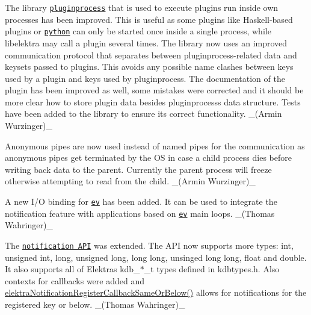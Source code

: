 \begin{DoxyItemize}
\item The library \href{http://master.libelektra.org/src/libs/pluginprocess}{\tt {\ttfamily pluginprocess}} that is used to execute plugins run inside own processes has been improved. This is useful as some plugins like Haskell-\/based plugins or \href{http://libelektra.org/plugins/python}{\tt {\ttfamily python}} can only be started once inside a single process, while libelektra may call a plugin several times. The library now uses an improved communication protocol that separates between pluginprocess-\/related data and keysets passed to plugins. This avoids any possible name clashes between keys used by a plugin and keys used by pluginprocess. The documentation of the plugin has been improved as well, some mistakes were corrected and it should be more clear how to store plugin data besides pluginprocess\textquotesingle{}s data structure. Tests have been added to the library to ensure its correct functionality. \+\_\+(\+Armin Wurzinger)\+\_\+
\item Anonymous pipes are now used instead of named pipes for the communication as anonymous pipes get terminated by the OS in case a child process dies before writing back data to the parent. Currently the parent process will freeze otherwise attempting to read from the child. \+\_\+(\+Armin Wurzinger)\+\_\+
\end{DoxyItemize}


\begin{DoxyItemize}
\item A new I/O binding for \href{https://www.libelektra.org/bindings/io_ev}{\tt ev} has been added. It can be used to integrate the notification feature with applications based on \href{http://libev.schmorp.de}{\tt ev} main loops. \+\_\+(\+Thomas Wahringer)\+\_\+
\end{DoxyItemize}


\begin{DoxyItemize}
\item The \href{https://doc.libelektra.org/api/latest/html/group__kdbnotification.html}{\tt notification A\+PI} was extended. The A\+PI now supports more types\+: {\ttfamily int}, {\ttfamily unsigned int}, {\ttfamily long}, {\ttfamily unsigned long}, {\ttfamily long long}, {\ttfamily unsinged long long}, {\ttfamily float} and {\ttfamily double}. It also supports all of Elektra\textquotesingle{}s {\ttfamily kdb\+\_\+$\ast$\+\_\+t} types defined in {\ttfamily kdbtypes.\+h}. Also contexts for callbacks were added and {\ttfamily \hyperlink{group__kdbnotification_ga374edd4f4fff527d6511ce4d0df62681}{elektra\+Notification\+Register\+Callback\+Same\+Or\+Below()}} allows for notifications for the registered key or below. \+\_\+(\+Thomas Wahringer)\+\_\+
\end{DoxyItemize}


